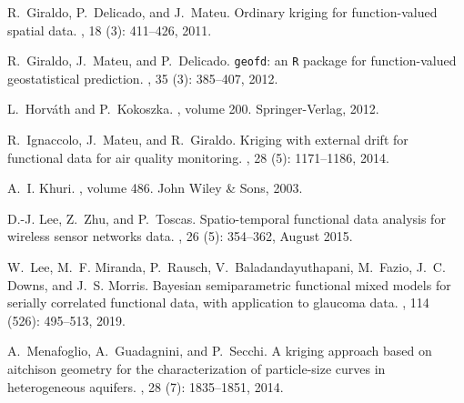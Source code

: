 \documentclass[12pt]{interact}
\theoremstyle{plain}%
\theoremstyle{definition}
\theoremstyle{remark}
\begin{document}
\begin{thebibliography}{25}
	R.~Giraldo, P.~Delicado, and J.~Mateu.
	\newblock Ordinary kriging for function-valued spatial data.
	, 18 (3):
	411--426, 2011.
	
	R.~Giraldo, J.~Mateu, and P.~Delicado.
	\newblock \texttt{geofd}: an \texttt{R} package for function-valued
	geostatistical prediction.
	, 35 (3):
	385--407, 2012.
	
	L.~Horv{\'a}th and P.~Kokoszka.
	, volume 200.
	\newblock Springer-Verlag, 2012.
	
	R.~Ignaccolo, J.~Mateu, and R.~Giraldo.
	\newblock Kriging with external drift for functional data for air quality
	monitoring.
	, 28
	(5): 1171--1186, 2014.
	
	A.~I. Khuri.
	, volume 486.
	\newblock John Wiley \& Sons, 2003.
	
	D.-J. Lee, Z.~Zhu, and P.~Toscas.
	\newblock Spatio-temporal functional data analysis for wireless sensor networks
	data.
	, 26 (5): 354--362, August 2015.
	
	W.~Lee, M.~F. Miranda, P.~Rausch, V.~Baladandayuthapani, M.~Fazio, J.~C. Downs,
	and J.~S. Morris.
	\newblock Bayesian semiparametric functional mixed models for serially
	correlated functional data, with application to glaucoma data.
	, 114
	(526): 495--513, 2019.
	
	A.~Menafoglio, A.~Guadagnini, and P.~Secchi.
	\newblock A kriging approach based on aitchison geometry for the
	characterization of particle-size curves in heterogeneous aquifers.
	, 28
	(7): 1835--1851, 2014.
	

\end{thebibliography}
\end{document}
